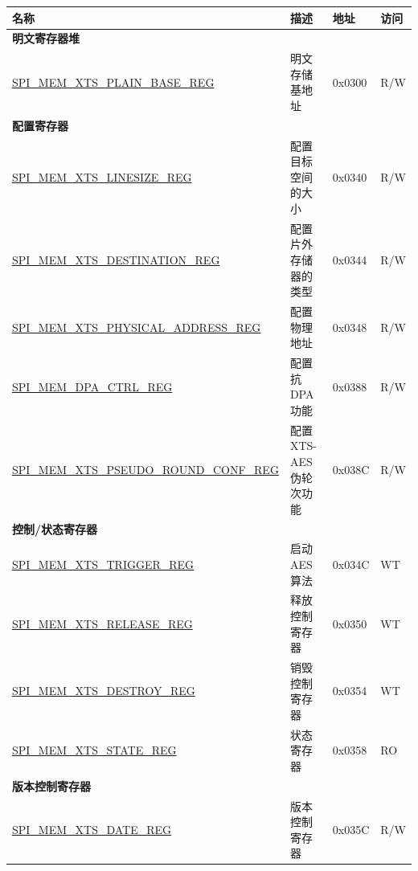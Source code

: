 \begin{longtable}{ | p{8cm} | p{5cm} | p{1.3cm} | p{1cm} | }
    \hline\rowcolor{lightgray}
    \textbf{名称} & \textbf{描述} & \textbf{地址} & \textbf{访问}\\ \hline
    \endhead


\multicolumn{4}{|l|}{\textbf{明文寄存器堆}} \\ \hline
\hyperref[regdesc:SPIMEMXTSPLAINBASEREG]{SPI\_MEM\_XTS\_PLAIN\_BASE\_REG}  & 明文存储基地址   & 0x0300 & R/W \\\hline
\multicolumn{4}{|l|}{\textbf{配置寄存器}} \\ \hline
\hyperref[regdesc:SPIMEMXTSLINESIZEREG]{SPI\_MEM\_XTS\_LINESIZE\_REG} & 配置目标空间的大小 & 0x0340 & R/W \\ \hline
\hyperref[regdesc:SPIMEMXTSDESTINATIONREG]{SPI\_MEM\_XTS\_DESTINATION\_REG} & 配置片外存储器的类型 & 0x0344 & R/W \\ \hline
\hyperref[regdesc:SPIMEMXTSPHYSICALADDRESSREG]{SPI\_MEM\_XTS\_PHYSICAL\_ADDRESS\_REG} & 配置物理地址 & 0x0348 & R/W \\ \hline
\hyperref[regdesc:SPIMEMDPACTRLREG]{SPI\_MEM\_DPA\_CTRL\_REG}  & 配置抗 DPA 功能      & 0x0388 & R/W \\\hline
\hyperref[regdesc:SPIMEMXTSPSEUDOROUNDCONFREG]{SPI\_MEM\_XTS\_PSEUDO\_ROUND\_CONF\_REG} & 配置 XTS-AES 伪轮次功能 & 0x038C & R/W \\ \hline
\multicolumn{4}{|l|}{\textbf{控制/状态寄存器}} \\ \hline
\hyperref[regdesc:SPIMEMXTSTRIGGERREG]{SPI\_MEM\_XTS\_TRIGGER\_REG} & 启动 AES 算法 & 0x034C & WT \\ \hline
\hyperref[regdesc:SPIMEMXTSRELEASEREG]{SPI\_MEM\_XTS\_RELEASE\_REG} & 释放控制寄存器 & 0x0350 & WT \\ \hline
\hyperref[regdesc:SPIMEMXTSDESTROYREG]{SPI\_MEM\_XTS\_DESTROY\_REG} & 销毁控制寄存器 & 0x0354 & WT \\ \hline
\hyperref[regdesc:SPIMEMXTSSTATEREG]{SPI\_MEM\_XTS\_STATE\_REG} & 状态寄存器 & 0x0358 & RO \\ \hline
\multicolumn{4}{|l|}{\textbf{版本控制寄存器}} \\ \hline
\hyperref[regdesc:SPIMEMXTSDATEREG]{SPI\_MEM\_XTS\_DATE\_REG} & 版本控制寄存器 & 0x035C & R/W \\ \hline
\end{longtable}
